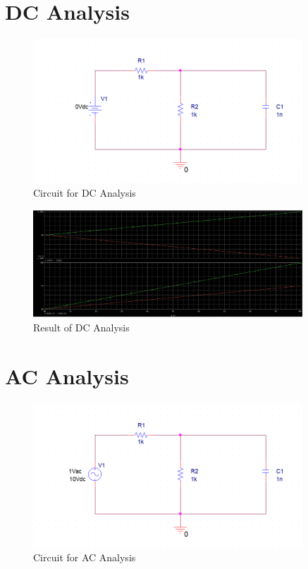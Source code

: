 \documentclass[12pt]{../manual}
\begin{document}
\section{DC Analysis}
\begin{figure}[ht!]
\begin{center}
\includegraphics[width=0.9\textwidth]{figures/DCAnalysisCircuitCrop.PNG}
\caption{Circuit for DC Analysis}
\label{fig:dc}
\end{center}
\end{figure}

\begin{figure}[ht!]
\begin{center}
\includegraphics[width=0.9\textwidth]{figures/ResultDCAnalysisCrop.PNG}
\caption{Result of DC Analysis}
\label{fig:dcAnalRes}
\end{center}
\end{figure}

\newpage
\section{AC Analysis}
\begin{figure}[ht!]
\begin{center}
\includegraphics[width=0.9\textwidth]{figures/ACAnalysisCircuitCrop.PNG}
\caption{Circuit for AC Analysis}
\label{fig:ac}
\end{center}
\end{figure}
\end{document}
